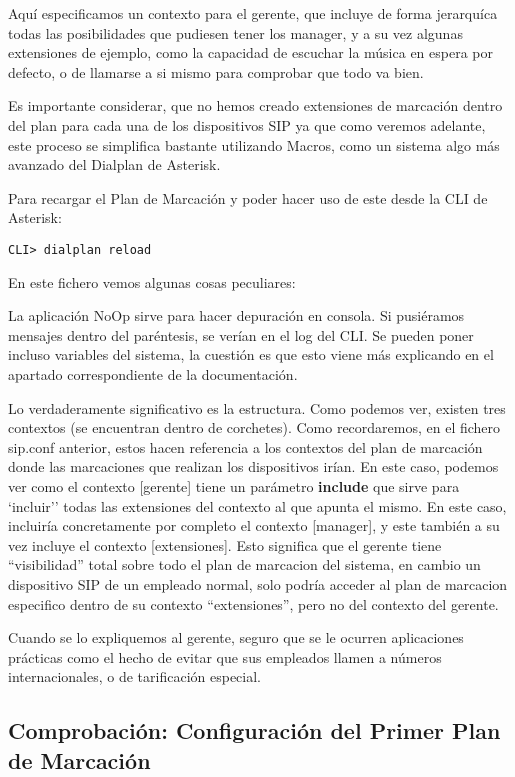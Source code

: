Aquí especificamos un contexto para el gerente, que incluye de forma jerarquíca todas las posibilidades que pudiesen tener los manager, y a su vez algunas extensiones de ejemplo, como la capacidad de escuchar la música en espera por defecto, o de llamarse a si mismo para comprobar que todo va bien.

Es importante considerar, que no hemos creado extensiones de marcación dentro del plan para cada una de los dispositivos SIP ya que como veremos adelante, este proceso se simplifica bastante utilizando Macros, como un sistema algo más avanzado del Dialplan de Asterisk.

Para recargar el Plan de Marcación y poder hacer uso de este desde la CLI de Asterisk:

\begin{lstlisting}[style=consola]
CLI> dialplan reload
\end{lstlisting}

 En este fichero vemos algunas cosas peculiares:

La aplicación NoOp sirve para hacer depuración en consola. Si pusiéramos mensajes dentro del paréntesis, se verían en el log del CLI. Se pueden poner incluso variables del sistema, la cuestión es que esto viene más explicando en el apartado correspondiente de la documentación.

Lo verdaderamente significativo es la estructura. Como podemos ver, existen tres contextos (se encuentran dentro de corchetes). Como recordaremos, en el fichero sip.conf anterior, estos hacen referencia a los contextos del plan de marcación donde las marcaciones que realizan los dispositivos irían. En este caso, podemos ver como el contexto [gerente] tiene un parámetro \textbf{include} que sirve para `incluir'' todas las extensiones del contexto al que apunta el mismo. En este caso, incluiría concretamente por completo el contexto [manager], y este también a su vez incluye el contexto [extensiones]. Esto significa que el gerente tiene ``visibilidad'' total sobre todo el plan de marcacion del sistema, en cambio un dispositivo SIP de un empleado normal, solo podría acceder al plan de marcacion especifico dentro de su contexto ``extensiones'', pero no del contexto del gerente.

Cuando se lo expliquemos al gerente, seguro que se le ocurren aplicaciones prácticas como el hecho de evitar que sus empleados llamen a números internacionales, o de tarificación especial.

\subsection{Comprobación: Configuración del Primer Plan de Marcación}

